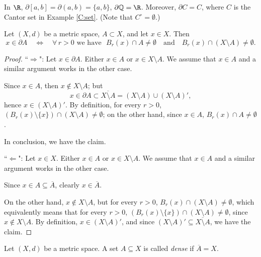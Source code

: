 \bis

\begin{example}
In $\R$, $\partial [a,b] = \partial (a,b) = \{a,b\}$, $\partial \mathbb{Q} = \R$. Moreover, $\partial C= C$, where $C$ is the Cantor set in Example \ref{C:set}. 
(Note that $C^\circ = \emptyset$.)

\end{example}

\bis

\begin{theorem}
Let $(X,d)$ be a metric space, $A\subset X$, and let $x\in X$. Then
$$
x\in \partial A \quad \Leftrightarrow \quad \forall \, r>0 \,\, \textrm{we have } \,\, B_r(x)\cap A\neq \emptyset \quad \textrm{and} \quad B_r(x)\cap (X\setminus A)\neq \emptyset.
$$
\end{theorem}

\np

\begin{proof}
``$\Rightarrow$": Let $x\in \partial A$. Either $x\in A$ or $x\in X\setminus A$. We assume that $x\in A$ and a similar argument works in the other case.

Since $x\in A$, then $x\notin X\setminus A$; but 
$$
x\in \partial A\subset \overline{X\setminus A} = (X\setminus A)\cup (X\setminus A)',
$$
hence $x\in (X\setminus A)'$. By definition, for every $r>0$, $(B_r(x)\setminus \{x\})\cap (X\setminus A)\neq \emptyset$; on the other hand, since 
$x\in A$, $B_r(x)\cap A\neq \emptyset$.

In conclusion, we have the claim.
\bis

``$\Leftarrow$": Let $x\in X$. Either $x\in A$ or $x\in X\setminus A$. We assume that $x\in A$ and a similar argument works in the other case.

Since $x\in A\subseteq \overline A$, clearly $x\in \overline A$.

On the other hand, $x\notin X\setminus A$, but for every $r>0$, $B_r(x) \cap (X\setminus A) \neq \emptyset$, which equivalently means that 
for every $r>0$, $(B_r(x)\setminus \{x\})\cap (X\setminus A)\neq \emptyset$, since $x\notin X\setminus A$. By definition, $x\in (X\setminus A)'$, 
and since $(X\setminus A)'\subseteq \overline{X\setminus A}$, we have the claim.
\end{proof}

\np

\begin{definition}
Let $(X,d)$ be a metric space. A set $A \subseteq X$ is called \emph{dense} 
if $\overline{A} = X$.
\end{definition}

